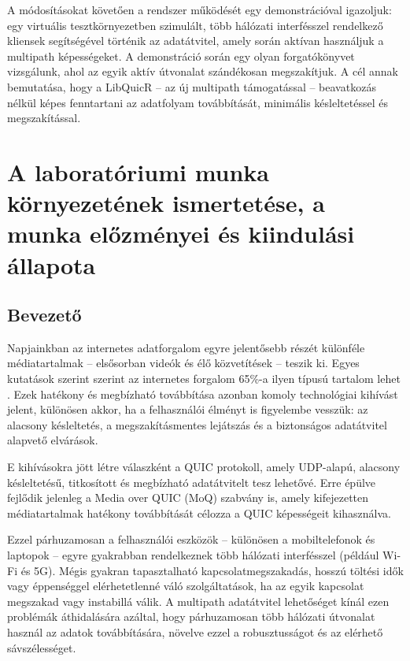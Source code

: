 \documentclass[a4paper,oneside]{article}
\begin{document}
\begin{titlepage}
{  A módosításokat követően a rendszer működését egy demonstrációval 
  igazoljuk: egy virtuális tesztkörnyezetben szimulált, több hálózati 
  interfésszel rendelkező kliensek segítségével történik az adatátvitel, 
  amely során aktívan használjuk a multipath képességeket. A demonstráció 
  során egy olyan forgatókönyvet vizsgálunk, ahol az egyik aktív 
  útvonalat szándékosan megszakítjuk. 
  A cél annak bemutatása, hogy a LibQuicR – az új multipath támogatással – 
  beavatkozás nélkül képes fenntartani az adatfolyam 
  továbbítását, minimális késleltetéssel és megszakítással.}

 
  
 
\end{titlepage} 

\section{A laboratóriumi munka környezetének ismertetése,
     a munka előzményei és kiindulási állapota}
\label{sec:kornyezet}
\subsection{Bevezető}
\label{sec:bevezeto}
Napjainkban az internetes adatforgalom egyre jelentősebb részét különféle médiatartalmak – 
elsősorban videók és élő közvetítések – teszik ki. Egyes kutatások szerint 
szerint az internetes forgalom 65\%-a ilyen típusú tartalom lehet \cite{live_stats}. 
Ezek hatékony és megbízható továbbítása azonban komoly 
technológiai kihívást jelent, különösen akkor, ha a felhasználói élményt is 
figyelembe vesszük: az alacsony késleltetés, a megszakításmentes lejátszás 
és a biztonságos adatátvitel alapvető elvárások.

E kihívásokra jött létre válaszként a QUIC protokoll, amely UDP-alapú, alacsony 
késleltetésű, titkosított és megbízható adatátvitelt tesz lehetővé. Erre épülve 
fejlődik jelenleg a Media over QUIC (MoQ) szabvány is, amely kifejezetten 
médiatartalmak hatékony továbbítását célozza a QUIC képességeit kihasználva.

Ezzel párhuzamosan a felhasználói eszközök – különösen a mobiltelefonok és 
laptopok – egyre gyakrabban rendelkeznek több hálózati interfésszel (például Wi-Fi és 5G). 
Mégis gyakran tapasztalható kapcsolatmegszakadás, hosszú töltési idők vagy éppenséggel 
elérhetetlenné váló szolgáltatások, ha az egyik kapcsolat megszakad vagy instabillá 
válik. A multipath adatátvitel lehetőséget kínál ezen problémák áthidalására azáltal, 
hogy párhuzamosan több hálózati útvonalat használ az adatok továbbítására, növelve 
ezzel a robusztusságot és az elérhető sávszélességet.
\end{document}
